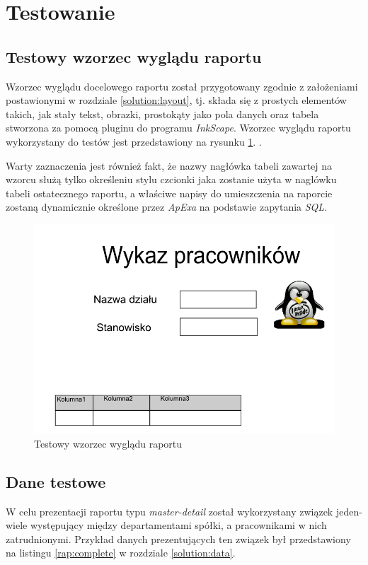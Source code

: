 \documentclass[11pt,a4paper]{article}
\begin{document}
\newpage
\section{Testowanie} \label{test}
\subsection{Testowy wzorzec wyglądu raportu} \label{test:layout}
Wzorzec wyglądu docelowego raportu został przygotowany zgodnie z założeniami postawionymi w rozdziale \ref{solution:layout}, tj. składa się z prostych elementów takich, jak stały tekst, obrazki, prostokąty jako pola danych oraz tabela stworzona za pomocą pluginu do programu \emph{InkScape}. Wzorzec wyglądu raportu wykorzystany do testów jest przedstawiony na rysunku \ref{img:sampleLayout}. . 

Warty zaznaczenia jest również fakt, że nazwy nagłówka tabeli zawartej na wzorcu służą tylko określeniu stylu czcionki jaka zostanie użyta w nagłówku tabeli ostatecznego raportu, a właściwe napisy do umieszczenia na raporcie zostaną dynamicznie określone przez \emph{ApExa} na podstawie zapytania \emph{SQL}.

\begin{figure}[h]
\centering
\includegraphics[scale=0.8]{sampleLayout}
\caption{Testowy wzorzec wyglądu raportu}
\label{img:sampleLayout}
\end{figure}

\subsection{Dane testowe} \label{test:data}
W celu prezentacji raportu typu \emph{master-detail} został wykorzystany związek jeden-wiele występujący między departamentami spółki, a pracownikami w nich zatrudnionymi. Przykład danych prezentujących ten związek był przedstawiony na listingu \ref{rap:complete} w rozdziale \ref{solution:data}.
\end{document}
